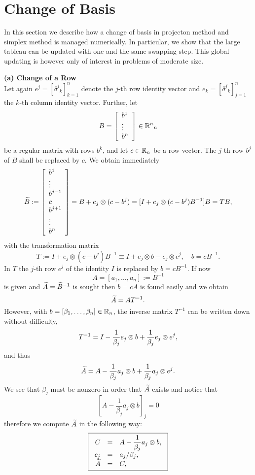 \section{Change of Basis}
In this section we describe how a change of basis in projecton method and
simplex method is managed numerically. In particular, we show that the large
tableau can be updated with one and the same swapping step. This global
updating is however only of interest in problems of moderate size.
\par
{\bf (a) Change of a Row}\\
Let again $e^j = [\delta ^j{}_k]_{k=1}^n$ denote the $j$-th row identity vector
and $e_k = [\delta^j{}_k]_{j=1}^n$ the $k$-th column identity vector.  Further,
let
\[
B = \ba{[}{l}b^1 \\ \vdots \\ b^n \ea{]} \in \Bbb{R}^n{}_n
\]
be a regular matrix with rows $b^k$, and let $c \in \Bbb{R}_n$ be a row vector.
The $j$-th row $b^j$ of $B$ shall be replaced by $c$.  We obtain immediately
\[
\wi{B} := \ba{[}{l}b^1 \\ \vdots \\ b^{j-1}\\c \\ b^{j+1} \\ \vdots\\ b^n
          \ea{]}
= B + e_j \otimes (c - b^j) = [I + e_j \otimes (c - b^j)B^{-1}]B =
TB,
\]
with the transformation matrix
\[
T := I + e_j \otimes (c - b^j)B^{-1} \equiv I + e_j \otimes b - e_j \otimes
e^j, \quad b = cB^{-1}.
\]
In $T$ the $j$-th row $e^j$ of the identity $I$ is replaced by $b = cB^{-1}$.
If now
\[
A = [a_1, \ldots, a_n] :=B^{-1}
\]
is given and $\wi{A} = \wi{B}^{-1}$ is sought then $b = cA$ is found easily and
we obtain
\[
\wi{A} = AT^{-1}.
\]
However, with $b = [\beta _1, \ldots, \beta _n] \in \Bbb{R}_n$, the inverse
matrix $T^{-1}$ can be written down without difficulty,
\[
\dis T^{-1} = I - \frac{1}{\beta _j}e_j \otimes b + \frac{1}{\beta _j}e_j
\otimes e^j,
\]
and thus
\[
\dis \wi{A} = A - \frac{1}{\beta _j}a_j \otimes b +
\frac{1}{\beta _j}a_j \otimes e^j.
\]
We see that $\beta _j$ must be nonzero in order that $\wi{A}$ exists and
notice that
\[
[A - \frac{1}{\beta _j}a_j \otimes b]_j = 0
\]
therefore we compute $\wi{A}$ in the following way:
%
\begin{equation} \label{e40a}
\fbox{$ \ba{.}{rcl}
C &=& \dis A - \frac{1}{\beta _j}a_j \otimes b,\\[0mm]
c_j &=& a_j/\beta _j,\\
\wi{A} &=&  C,
\ea{.}
$}
\end{equation}
